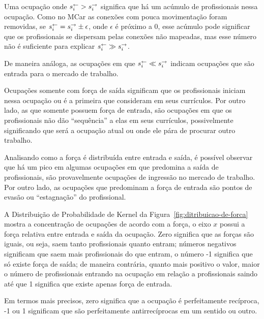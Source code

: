 \documentclass[12pt,a4paper]{article}
\begin{document}
Uma ocupação onde $s^\leftarrow_i > s^\rightarrow_i$ significa que há um acúmulo de profissionais nessa ocupação. Como no MCar as conexões com pouca movimentação foram removidas, se $s^\leftarrow_i = s^\rightarrow_i \pm \epsilon$, onde $\epsilon$ é próximo a 0, esse acúmulo pode significar que os profissionais se dispersam pelas conexões não mapeadas, mas esse número não é suficiente para explicar $s^\leftarrow_i \gg s^\rightarrow_i$.

\begin{hypothesis}
    De maneira análoga, as ocupações em que $s^\leftarrow_i \ll s^\rightarrow_i$ indicam ocupações que são entrada para o mercado de trabalho.
\end{hypothesis}

Ocupações somente com força de saída significam que os profissionais iniciam nessa ocupação ou é a primeira que consideram em seus currículos. Por outro lado, as que somente possuem força de entrada, são ocupações em que os profissionais não dão “sequência” a elas em seus currículos, possivelmente significando que será a ocupação atual ou onde ele pára de procurar outro trabalho.

Analisando como a força é distribuída entre entrada e saída, é possível observar que há um pico em algumas ocupações em que predomina a saída de profissionais, são provavelmente ocupações de ingressão no mercado de trabalho. Por outro lado, as ocupações que predominam a força de entrada são pontos de evasão ou “estagnação” do profissional.

A Distribuição de Probabilidade de Kernel da Figura~\ref{fig:ditribuicao-de-forca} mostra a concentração de ocupações de acordo com a força, o eixo $x$ possui a força relativa entre entrada e saída da ocupação. Zero significa que as forças são iguais, ou seja, saem tanto profissionais quanto entram; números negativos significam que saem mais profissionais do que entram, o número -1 significa que só existe força de saída; de maneira contrária, quanto mais positivo o valor, maior o número de profissionais entrando na ocupação em relação a profissionais saindo até que 1 significa que existe apenas força de entrada.

Em termos mais precisos, zero significa que a ocupação é perfeitamente recíproca, -1 ou 1 significam que são perfeitamente antirrecíprocas em um sentido ou outro.
\end{document}
